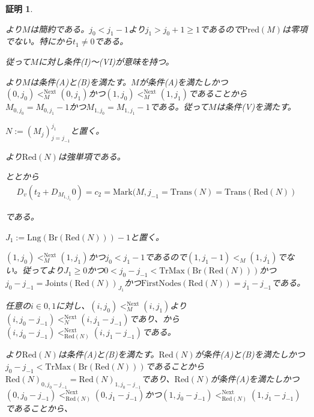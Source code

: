\documentclass[dvipdfmx,uplatex]{jsarticle}
\theoremstyle{customnonumberbreakfortheorem}
\theoremstyle{customnonumberbreakforproof}
\newtheorem{hideableproof}{証明}
\begin{document}
\begin{hideableproof}
	\begin{indented}
		\item {}より\(M\)は簡約である。\(j_0 < j_1-1\)より\(j_1 > j_0+1 \geq 1\)であるので\(\textrm{Pred}(M)\)は零項でない。特にから\(t_1 \neq 0\)である。
		\item 従って\(M\)に対し条件(I)～(VI)が意味を持つ。
		\item {}より\(M\)は条件(A)と(B)を満たす。\(M\)が条件(A)を満たしかつ\((0,j_0) <_M^{\textrm{Next}} (0,j_1)\)かつ\((1,j_0) <_M^{\textrm{Next}} (1,j_1)\)であることから\(M_{0,j_0} = M_{0,j_1}-1\)かつ\(M_{1,j_0} = M_{1,j_1}-1\)である。従って\(M\)は条件(V)を満たす。
		\item \(N := (M_j)_{j=j_{-1}}^{j_1}\)と置く。
		\item {}より\(\textrm{Red}(N)\)は強単項である。
		\item {}ととから
		\begin{eqnarray*}
		D_v(t_2 + D_{M_{1,j_1}} 0) = c_2 = \textrm{Mark}(M,j_{-1} = \textrm{Trans}(N) = \textrm{Trans}(\textrm{Red}(N))
		\end{eqnarray*}
		\item である。
		\item \(J_1 := \textrm{Lng}(\textrm{Br}(\textrm{Red}(N)))-1\)と置く。
		\item \((1,j_0) <_M^{\textrm{Next}} (1,j_1)\)かつ\(j_0 < j_1-1\)であるので\((1,j_1-1) <_M (1,j_1)\)でない。従ってより\(J_1 \geq 0\)かつ\(0 < j_0-j_{-1} < \textrm{TrMax}(\textrm{Br}(\textrm{Red}(N)))\)かつ\(j_0-j_{-1} = \textrm{Joints}(\textrm{Red}(N))_{J_1}\)かつ\(\textrm{FirstNodes}(\textrm{Red}(N)) = j_1-j_{-1}\)である。
		\item 任意の\(i \in {0,1}\)に対し、\((i,j_0) <_M^{\textrm{Next}} (i,j_1)\)より\((i,j_0-j_{-1}) <_N^{\textrm{Next}} (i,j_1-j_{-1})\)であり、から\((i,j_0-j_{-1}) <_{\textrm{Red}(N)}^{\textrm{Next}} (i,j_1-j_{-1})\)である。
		\item {}より\(\textrm{Red}(N)\)は条件(A)と(B)を満たす。\(\textrm{Red}(N)\)が条件(A)と(B)を満たしかつ\(j_0-j_{-1} < \textrm{TrMax}(\textrm{Br}(\textrm{Red}(N)))\)であることから\(\textrm{Red}(N)_{0,j_0-j_{-1}} = \textrm{Red}(N)_{1,j_0-j_{-1}}\)であり、\(\textrm{Red}(N)\)が条件(A)を満たしかつ\((0,j_0-j_{-1}) <_{\textrm{Red}(N)}^{\textrm{Next}} (0,j_1-j_{-1})\)かつ\((1,j_0-j_{-1}) <_{\textrm{Red}(N)}^{\textrm{Next}} (1,j_1-j_{-1})\)であることから、

\end{indented}
\end{hideableproof}
\end{document}
